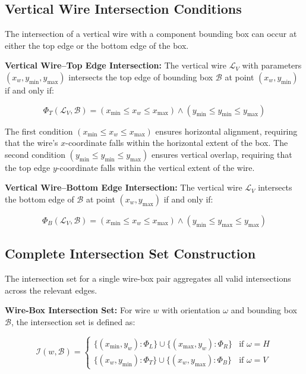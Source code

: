\subsection{Vertical Wire Intersection Conditions}

The intersection of a vertical wire with a component bounding box can occur at either the top edge or the bottom edge of the box.

\textbf{Vertical Wire–Top Edge Intersection:} The vertical wire $\mathcal{L}_V$ with parameters $(x_w, y_{\min}, y_{\max})$ intersects the top edge of bounding box $\mathcal{B}$ at point $(x_w, y_{\min})$ if and only if:

\begin{equation}
\Phi_T(\mathcal{L}_V, \mathcal{B}) = (x_{\min} \le x_w \le x_{\max}) \land (y_{\min} \le y_{\min} \le y_{\max})
\label{eq:vertical-top-intersection}
\end{equation}

The first condition $(x_{\min} \le x_w \le x_{\max})$ ensures horizontal alignment, requiring that the wire's $x$-coordinate falls within the horizontal extent of the box. The second condition $(y_{\min} \le y_{\min} \le y_{\max})$ ensures vertical overlap, requiring that the top edge $y$-coordinate falls within the vertical extent of the wire.

\textbf{Vertical Wire–Bottom Edge Intersection:} The vertical wire $\mathcal{L}_V$ intersects the bottom edge of $\mathcal{B}$ at point $(x_w, y_{\max})$ if and only if:

\begin{equation}
\Phi_B(\mathcal{L}_V, \mathcal{B}) = (x_{\min} \le x_w \le x_{\max}) \land (y_{\min} \le y_{\max} \le y_{\max})
\label{eq:vertical-bottom-intersection}
\end{equation}

\subsection{Complete Intersection Set Construction}

The intersection set for a single wire-box pair aggregates all valid intersections across the relevant edges.

\textbf{Wire-Box Intersection Set:} For wire $w$ with orientation $\omega$ and bounding box $\mathcal{B}$, the intersection set is defined as:

\begin{equation}
\mathcal{I}(w, \mathcal{B}) = \begin{cases}
\{(x_{\min}, y_w) : \Phi_L\} \cup \{(x_{\max}, y_w) : \Phi_R\} & \text{if } \omega = H \\
\{(x_w, y_{\min}) : \Phi_T\} \cup \{(x_w, y_{\max}) : \Phi_B\} & \text{if } \omega = V
\end{cases}
\label{eq:wire-box-intersection-set}
\end{equation}

